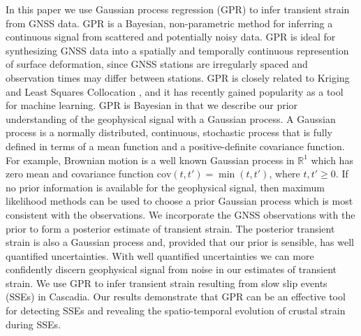 \documentclass[10pt,letter]{article}
\begin{document}
In this paper we use Gaussian process regression (GPR) \citep{Rasmussen2006} to infer transient strain from GNSS data. GPR is a Bayesian, non-parametric method for inferring a continuous signal from scattered and potentially noisy data. GPR is ideal for synthesizing GNSS data into a spatially and temporally continuous represention of surface deformation, since GNSS stations are irregularly spaced and observation times may differ between stations. GPR is closely related to Kriging \citep{Cressie1992} and Least Squares Collocation \citep{Kato1998}, and it has recently gained popularity as a tool for machine learning. GPR is Bayesian in that we describe our prior understanding of the geophysical signal with a Gaussian process. A Gaussian process is a normally distributed, continuous, stochastic process that is fully defined in terms of a mean function and a positive-definite covariance function. For example, Brownian motion is a well known Gaussian process in $\mathbb{R}^1$ which has zero mean and covariance function $\mathrm{cov}(t,t')=\min(t,t')$, where $t,t' \ge 0$. If no prior information is available for the geophysical signal, then maximum likelihood methods can be used to choose a prior Gaussian process which is most consistent with the observations.  We incorporate the GNSS observations with the prior to form a posterior estimate of transient strain. The posterior transient strain is also a Gaussian process and, provided that our prior is sensible, has well quantified uncertainties. With well quantified uncertainties we can more confidently discern geophysical signal from noise in our estimates of transient strain.  We use GPR to infer transient strain resulting from slow slip events (SSEs) in Cascadia. Our results demonstrate that GPR can be an effective tool for detecting SSEs and revealing the spatio-temporal evolution of crustal strain during SSEs. 
\end{document}

